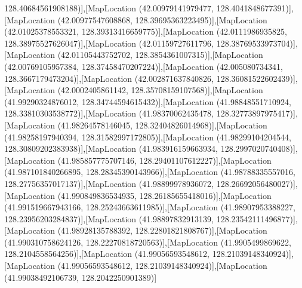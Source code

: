 128.40684561908188)],[MapLocation (42.00979141979477, 128.4041848677391)],[MapLocation (42.00977547608868, 128.39695363223495)],[MapLocation (42.01025378553321, 128.39313416659775)],[MapLocation (42.0111986935825, 128.38975527626047)],[MapLocation (42.01159727611796, 128.38769533973704)],[MapLocation (42.01105443752702, 128.3854361007315)],[MapLocation (42.00769105957384, 128.37458470207224)],[MapLocation (42.005080734341, 128.3667179473204)],[MapLocation (42.002871637840826, 128.36081522602439)],[MapLocation (42.0002405861142, 128.35708159107568)],[MapLocation (41.99290324876012, 128.34744594615432)],[MapLocation (41.98848551710924, 128.33810303538772)],[MapLocation (41.98370062435478, 128.32773897975417)],[MapLocation (41.98264578146045, 128.32404826014968)],[MapLocation (41.98258197940394, 128.31582997172805)],[MapLocation (41.98299104204544, 128.30809202383938)],[MapLocation (41.983916159663934, 128.2997020740408)],[MapLocation (41.985857775707146, 128.29401107612227)],[MapLocation (41.987101840266895, 128.28345390143966)],[MapLocation (41.98788335557016, 128.27756357017137)],[MapLocation (41.98899978936072, 128.26692056480027)],[MapLocation (41.990849836534935, 128.26185655418016)],[MapLocation (41.991519667943166, 128.25243663611985)],[MapLocation (41.98907953388227, 128.23956203284837)],[MapLocation (41.98897832913139, 128.23542111496877)],[MapLocation (41.98928135788392, 128.22801821808767)],[MapLocation (41.990310758624126, 128.22270818720563)],[MapLocation (41.9905499869622, 128.2104558564256)],[MapLocation (41.99056593548612, 128.21039148340924)],[MapLocation (41.99056593548612, 128.21039148340924)],[MapLocation (41.99038492106739, 128.2042250901389)]